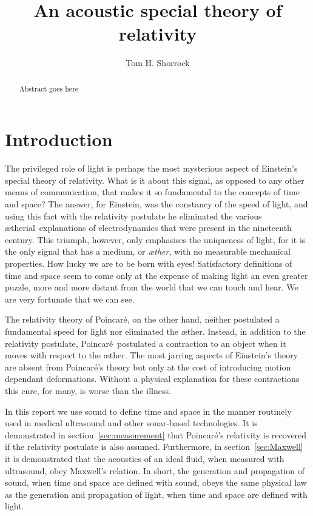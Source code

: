 \documentclass[10pt, fleqn,draft,showtrims,oldfontcommands]{article} %
\title{An acoustic special theory of relativity}
\author{Tom H. Shorrock}
\newcommand{\aether}{\ae ther}
\newcommand{\aetherial}{\ae therial}
\newcommand{\Poincare}{Poincar{\'e}}
\begin{document}
\maketitle
\begin{abstract}
Abstract goes here
\end{abstract}

\section{Introduction}\label{sec:introduction}

The privileged role of light is perhaps the most mysterious aspect of Einstein's special theory of relativity.
What is it about this signal, as opposed to any other means of communication, that makes it  so fundamental to the  concepts of time and space?
The answer, for Einstein, was the constancy of the speed of light,
and using this fact with the relativity postulate he eliminated the  various \aetherial\ explanations of electrodynamics that were present in the nineteenth century.
This triumph, however, only emphasises the uniqueness of light, for it is the  only  signal that has a  medium, or {\em \aether}, with no measurable mechanical properties.
How lucky we are to be born with eyes! %
Satisfactory definitions of time and space seem to come only at the expense of making light  an even greater puzzle,
more and more distant from the world that we can touch and hear.
We are very fortunate that we can see.

The relativity theory of \Poincare, on the other hand,  neither  postulated  a fundamental speed for light nor eliminated the \aether.
Instead, in addition to the relativity postulate, \Poincare\ postulated a  contraction to an object  when it moves with respect to the \aether.
The most jarring aspects of Einstein's theory are absent from \Poincare's theory but only at the cost of introducing motion dependant deformations.
Without a  physical explanation for these contractions
this cure, for many, is worse than the illness.

In this report we use sound to define time and space 
in the manner  routinely used in medical ultrasound and other sonar-based technologies.
It is demonstrated in section~\ref{sec:measurement} that \Poincare's relativity is recovered if the relativity postulate is also assumed.
Furthermore, in section~\ref{sec:Maxwell} it is demonstrated that the acoustics of an ideal fluid, when measured with ultrasound, 
obey Maxwell's relation.
In short, the generation and propagation of sound,  when time and space are defined with  sound,
obeys the same physical law as the generation and propagation of light,  when time and space are defined with light.
\end{document}
